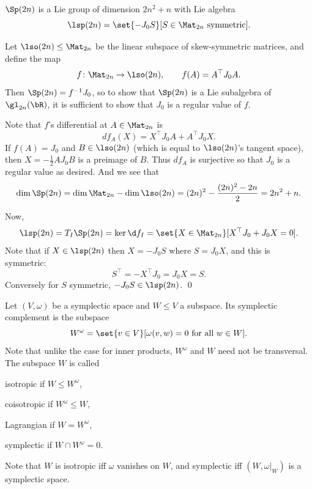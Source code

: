 \eexam

\bprop[name={eucsplie}]

    $\Sp(2n)$ is a Lie group of dimension $2n^2+n$ with Lie algebra
    $$ \lsp(2n) = \set{-J_0S}[S\in\Mat_{2n}\hbox{ symmetric}] . $$

\eprop

\bproof

    Let $\lso(2n)\leq\Mat_{2n}$ be the linear subspace of skew-symmetric matrices, and define the map
    $$ f\colon\Mat_{2n}\to\lso(2n),\qquad f(A) = A^\top J_0A . $$
    Then $\Sp(2n)=f^{-1}J_0$, so to show that $\Sp(2n)$ is a Lie subalgebra of $\gl_{2n}(\bR)$, it is sufficient to show that $J_0$ is a regular value of $f$.

    Note that $f$'s differential at $A\in\Mat_{2n}$ is
    $$ df_A(X) = X^\top J_0A + A^\top J_0X . $$
    If $f(A)=J_0$ and $B\in\lso(2n)$ (which is equal to $\lso(2n)$'s tangent space), then $X=-\frac12AJ_0B$ is a preimage of $B$.
    Thus $df_A$ is surjective so that $J_0$ is a regular value as desired.
    And we see that
    $$ \dim\Sp(2n) = \dim\Mat_{2n}-\dim\lso(2n) = (2n)^2 - \frac{(2n)^2-2n}2 = 2n^2 + n . $$

    Now,
    $$ \lsp(2n) = T_I\Sp(2n) = \ker\d f_I = \set{X\in\Mat_{2n}}[X^\top J_0+J_0X=0] . $$
    Note that if $X\in\lsp(2n)$ then $X=-J_0S$ where $S=J_0X$, and this is symmetric:
    $$ S^\top = -X^\top J_0 = J_0X = S . $$
    Conversely for $S$ symmetric, $-J_0S\in\lsp(2n)$.
    \qed

\eproof

\bdefn

    Let $(V,\omega)$ be a symplectic space and $W\leq V$ a subspace.
    Its {\emphcolor symplectic complement} is the subspace
    $$ W^\omega = \set{v\in V}[\omega(v,w)=0\hbox{ for all $w\in W$}] . $$
    Note that unlike the case for inner products, $W^\omega$ and $W$ need not be transversal.
    The subspace $W$ is called
    \benum
        \item {\emphcolor isotropic} if $W\leq W^\omega$,
        \item {\emphcolor coisotropic} if $W^\omega\leq W$,
        \item {\emphcolor Lagrangian} if $W=W^\omega$,
        \item {\emphcolor symplectic} if $W\cap W^\omega=0$.
    \eenum

\edefn

Note that $W$ is isotropic iff $\omega$ vanishes on $W$, and symplectic iff $(W,\omega|_W)$ is a symplectic space.

